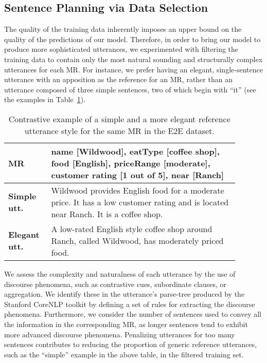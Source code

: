 \documentclass[11pt,a4paper]{article}
\begin{document}
\subsection{Sentence Planning via Data Selection}
\label{subsec:data_filtering}

The quality of the training data inherently imposes an upper bound on the quality of the predictions of our model. Therefore, in order to bring our model to produce more sophisticated utterances, we experimented with filtering the training data to contain only the most natural sounding and structurally complex utterances for each MR. For instance, we prefer having an elegant, single-sentence utterance with an apposition as the reference for an MR, rather than an utterance composed of three simple sentences, two of which begin with ``it'' (see the examples in Table~\ref{table:utterance_style_examples}).

\begin{table}
    \small
   	\centering
    \begin{tabular}{>{\centering\arraybackslash} m{0.15\linewidth} m{0.74\linewidth}}
    	\toprule
    	\textbf{MR} & name [Wildwood], eatType [coffee shop], food [English], priceRange [moderate], customer rating [1 out of 5], near [Ranch] \\
        \midrule
    	\textbf{Simple utt.} & Wildwood provides English food for a moderate price. It has a low customer rating and is located near Ranch. It is a coffee shop. \\
        \midrule
    	\textbf{Elegant utt.} & A low-rated English style coffee shop around Ranch, called Wildwood, has moderately priced food. \\
        \bottomrule
    \end{tabular}
 	\vspace{-0.2cm}
	\caption{Contrastive example of a simple and a more elegant reference utterance style for the same MR in the E2E dataset.}
    \label{table:utterance_style_examples}
\end{table}

We assess the complexity and naturalness of each utterance by the use of discourse phenomena, such as contrastive cues, subordinate clauses, or aggregation. We identify these in the utterance's parse-tree produced by the Stanford CoreNLP toolkit \cite{manning2014stanford} by defining a set of rules for extracting the discourse phenomena. Furthermore, we consider the number of sentences used to convey all the information in the corresponding MR, as longer sentences tend to exhibit more advanced discourse phenomena. Penalizing utterances for too many sentences contributes to reducing the proportion of generic reference utterances, such as the ``simple'' example in the above table, in the filtered training set.
\end{document}
